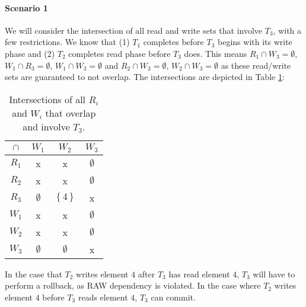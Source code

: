 \documentclass[11pt,a4paper,english]{article}
\begin{document}
\paragraph{Scenario 1}
We will consider the intersection of all read and write sets that involve
$T_{3}$, with a few restrictions. We know that (1) $T_{1}$ completes before
$T_{3}$ begins with its write phase and (2) $T_{2}$ completes read phase before
$T_{3}$ does. This means $R_{1} \cap W_{3} = \emptyset$,
$W_{1} \cap R_{3} = \emptyset$, $W_{1} \cap W_{3} = \emptyset$ and
$R_{2} \cap W_{3} = \emptyset$, $W_{2} \cap W_{3} = \emptyset$ as these
read/write sets are guaranteed to not overlap. The intersections are depicted in
Table \ref{tbl:scenario1}:
\begin{table}[!hbt]
\centering
\begin{tabular}{|c|c|c|c|}
\hline
$\cap$  & $W_{1}$ & $W_{2}$ & $W_{3}$    \\ \hline
$R_{1}$ & x  & x  & $\emptyset$ \\ \hline
$R_{2}$ & x  & x  & $\emptyset$ \\ \hline
$R_{3}$ & $\emptyset$ & $\left\{ 4 \right\}$ & x \\ \hline
$W_{1}$ & x  & x  & $\emptyset$ \\ \hline
$W_{2}$ & x  & x  & $\emptyset$ \\ \hline
$W_{3}$ & $\emptyset$ & $\emptyset$ & x \\ \hline
\end{tabular}
\caption{Intersections of all $R_{i}$ and $W_{i}$ that overlap and involve $T_{3}$.}
\label{tbl:scenario1}
\end{table}

In the case that $T_{2}$ writes element $4$ after $T_{3}$ has read element $4$,
$T_{3}$ will have to perform a rollback, as RAW dependency is violated. In the
case where $T_{2}$ writes element $4$ before $T_{3}$ reads element $4$, $T_{3}$
can commit.
\end{document}
